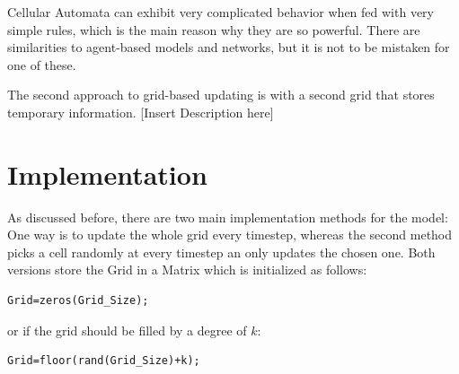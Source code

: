 \documentclass[11pt]{article}
\begin{document}
Cellular Automata can exhibit very complicated behavior when fed with very simple rules, which is the main reason why they are so powerful. There are similarities to agent-based models and networks, but it is not to be mistaken for one of these.


The second approach to grid-based updating is with a second grid that stores temporary information. [Insert Description here]


\section{Implementation}
As discussed before, there are two main implementation methods for the model: One way is to update the whole grid every timestep, whereas the second method picks a cell randomly at every timestep an only updates the chosen one.
Both versions store the Grid in a Matrix which is initialized as follows:
\begin{verbatim}
Grid=zeros(Grid_Size);
\end{verbatim}
or if the grid should be filled by a degree of $k$:
\begin{verbatim}
Grid=floor(rand(Grid_Size)+k);
\end{verbatim}
\end{document}
